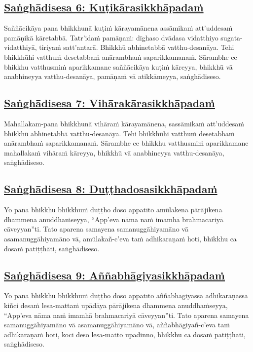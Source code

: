 \subsection*{\hyperref[comm6]{Saṅghādisesa 6: Kuṭikārasikkhāpadaṁ}}
\label{sd6}
Saññācikāya pana bhikkhunā kuṭiṁ kārayamānena assāmikaṁ att'uddesaṁ pamāṇikā kāretabbā. Tatr'idaṁ pamāṇaṁ: dīghaso dvādasa vidatthiyo sugata-vidatthiyā, tiriyaṁ satt'antarā. Bhikkhū abhinetabbā vatthu-desanāya. Tehi bhikkhūhi vatthuṁ desetabbaṁ anārambhaṁ saparikkamanaṁ. Sārambhe ce bhikkhu vatthusmiṁ aparikkamane saññācikāya kuṭiṁ kāreyya, bhikkhū vā anabhineyya vatthu-desanāya, pamāṇaṁ vā atikkāmeyya, saṅghādiseso.

\subsection*{\hyperref[comm7]{Saṅghādisesa 7: Vihārakārasikkhāpadaṁ}}
\label{sd7}
Mahallakam-pana bhikkhunā vihāraṁ kārayamānena, sassāmikaṁ att'uddesaṁ bhikkhū abhinetabbā vatthu-desanāya. Tehi bhikkhūhi vatthuṁ desetabbaṁ anārambhaṁ saparikkamanaṁ. Sārambhe ce bhikkhu vatthusmiṁ aparikkamane mahallakaṁ vihāraṁ kāreyya, bhikkhū vā anabhineyya vatthu-desanāya, saṅghādiseso.

\subsection*{\hyperref[comm8]{Saṅghādisesa 8: Duṭṭhadosasikkhāpadaṁ}}
\label{sd8}
Yo pana bhikkhu bhikkhuṁ duṭṭho doso appatīto amūlakena pārājikena dhammena anuddhaṁseyya, “App'eva nāma naṁ imamhā brahmacariyā cāveyyan”ti. Tato aparena samayena samanuggāhiyamāno vā asamanuggāhiyamāno vā, amūlakañ-c'eva taṁ adhikaraṇaṁ hoti, bhikkhu ca dosaṁ patiṭṭhāti, saṅghādiseso.

\subsection*{\hyperref[comm9]{Saṅghādisesa 9: Aññabhāgiyasikkhāpadaṁ}}
\label{sd9}
Yo pana bhikkhu bhikkhuṁ duṭṭho doso appatīto aññabhāgiyassa adhikaraṇassa kiñci desaṁ lesa-mattaṁ upādāya pārājikena dhammena anuddhaṁseyya, “App'eva nāma naṁ imamhā brahmacariyā cāveyyan”ti. Tato aparena samayena samanuggāhiyamāno vā asamanuggāhiyamāno vā, aññabhāgiyañ-c'eva taṁ adhikaraṇaṁ hoti, koci deso lesa-matto upādinno, bhikkhu ca dosaṁ patiṭṭhāti, saṅghādiseso.

